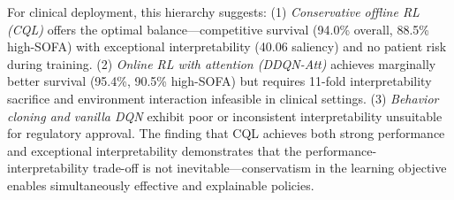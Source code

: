 For clinical deployment, this hierarchy suggests: (1) \textit{Conservative offline RL (CQL)} offers the optimal balance---competitive survival (94.0\% overall, 88.5\% high-SOFA) with exceptional interpretability (40.06 saliency) and no patient risk during training. (2) \textit{Online RL with attention (DDQN-Att)} achieves marginally better survival (95.4\%, 90.5\% high-SOFA) but requires 11-fold interpretability sacrifice and environment interaction infeasible in clinical settings. (3) \textit{Behavior cloning and vanilla DQN} exhibit poor or inconsistent interpretability unsuitable for regulatory approval. The finding that CQL achieves both strong performance and exceptional interpretability demonstrates that the performance-interpretability trade-off is not inevitable---conservatism in the learning objective enables simultaneously effective and explainable policies.

